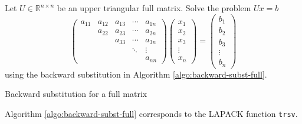 \documentclass[11pt, a4paper]{book}
\begin{document}
Let $U\in \mathbb{R}^{n\times n}$ be an upper triangular full matrix. Solve the problem
$Ux=b$
\begin{equation}
  \begin{pmatrix}
    a_{11} & a_{12} & a_{13} & \cdots & a_{1n} \\
    & a_{22} & a_{23} & \cdots & a_{2n} \\
    & & a_{33} & \cdots & a_{3n} \\
    & & & \ddots & \vdots \\
    & & & & a_{nn}
  \end{pmatrix}
  \begin{pmatrix}
    x_1\\x_2\\x_3\\\vdots\\x_n
  \end{pmatrix}=
  \begin{pmatrix}
    b_1\\b_2\\b_3\\\vdots\\b_n
  \end{pmatrix}
\end{equation}
using the backward substitution in Algorithm \ref{algo:backward-subst-full}.
\begin{breakablealgorithm}
  \label{algo:backward-subst-full}
  \caption{Backward substitution for a full matrix}
  \begin{algorithmic}[1]
        \EndFor
      \EndFor
    \EndProcedure
  \end{algorithmic}
\end{breakablealgorithm}

Algorithm \ref{algo:backward-subst-full} corresponds to the LAPACK function \texttt{trsv}.
\end{document}
